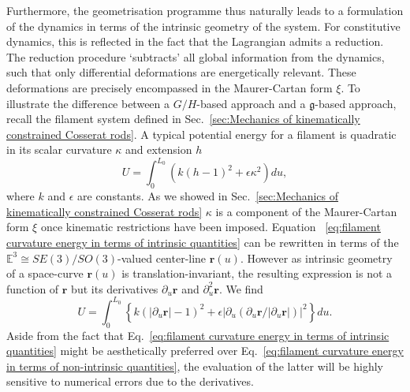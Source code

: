 Furthermore, the geometrisation programme thus naturally leads to a formulation of the dynamics in terms of the intrinsic geometry of the system. For constitutive dynamics, this is reflected in the fact that the Lagrangian admits a reduction. The reduction procedure `subtracts' all global information from the dynamics, such that only differential deformations are energetically relevant. These deformations are precisely encompassed in the Maurer-Cartan form $\xi$. To illustrate the difference between a $G/H$-based approach and a $\mathfrak{g}$-based approach, recall the filament system defined in Sec.~\ref{sec:Mechanics of kinematically constrained Cosserat rods}. A typical potential energy for a filament is quadratic in its scalar curvature $\kappa$ and extension $h$ \citep{sodaDynamicsStiffChains1973, goldsteinNonlinearDynamicsStiff1995}
\begin{equation} \label{eq:filament curvature energy in terms of intrinsic quantities}
U = \int_0^{L_0} (k (h-1)^2 +  \epsilon \kappa^2) du,
\end{equation}
where $k$ and $\epsilon$ are constants. As we showed in Sec.~\ref{sec:Mechanics of kinematically constrained Cosserat rods} $\kappa$ is a component of the Maurer-Cartan form $\xi$ once kinematic restrictions have been imposed. Equation ~\ref{eq:filament curvature energy in terms of intrinsic quantities} can be rewritten in terms of the $\mathbb{E}^3 \cong SE(3)/SO(3)$-valued center-line $\mathbf{r}(u)$. However as intrinsic geometry of a space-curve $\mathbf{r}(u)$ is translation-invariant, the resulting expression is not a function of $\mathbf{r}$ but its derivatives $\partial_u \mathbf{r}$ and $\partial_u^2 \mathbf{r}$. We find
\begin{equation} \label{eq:filament curvature energy in terms of non-intrinsic quantities}
U = \int_0^{L_0} \left\{ k \left( |\partial_u \mathbf{r}| - 1 \right)^2 + \epsilon \left| \partial_u \left( \partial_u \mathbf{r} / |\partial_u \mathbf{r} | \right) \right|^2  \right\} du.
\end{equation}
Aside from the fact that Eq.~\ref{eq:filament curvature energy in terms of intrinsic quantities} might be aesthetically preferred over Eq.~\ref{eq:filament curvature energy in terms of non-intrinsic quantities}, the evaluation of the latter will be highly sensitive to numerical errors due to the derivatives.

